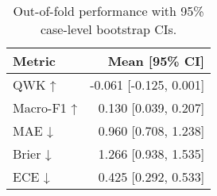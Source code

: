 \begin{table}
\caption{Out-of-fold performance with 95\% case-level bootstrap CIs.}
\label{tab:oof-performance}
\begin{tabular}{lr}
\toprule
Metric & Mean [95\% CI] \\
\midrule
QWK ↑ & -0.061 [-0.125, 0.001] \\
Macro-F1 ↑ & 0.130 [0.039, 0.207] \\
MAE ↓ & 0.960 [0.708, 1.238] \\
Brier ↓ & 1.266 [0.938, 1.535] \\
ECE ↓ & 0.425 [0.292, 0.533] \\
\bottomrule
\end{tabular}
\end{table}
